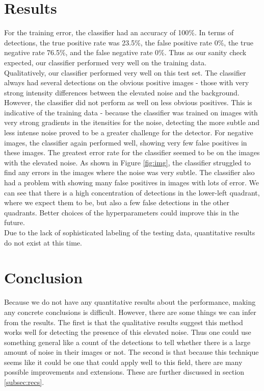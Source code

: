 \documentclass[twocolumn,longauthor]{aastex61}
\begin{document}
\newpage
\section{Results} \label{sec:results}
\noindent For the training error, the classifier had an accuracy of 100\%. In terms of detections, the true positive rate was 23.5\%, the false positive rate 0\%, the true negative rate 76.5\%, and the false negative rate 0\%. Thus as our sanity check expected, our classifier performed very well on the training data.\\
\indent Qualitatively, our classifier performed very well on this test set. The classifier always had several detections on the obvious positive images - those with very strong intensity differences between the elevated noise and the background. However, the classifier did not perform as well on less obvious positives. This is indicative of the training data - because the classifier was trained on images with very strong gradients in the itensities for the noise, detecting the more subtle and less intense noise proved to be a greater challenge for the detector. For negative images, the classifier again performed well, showing very few false positives in these images. The greatest error rate for the classifier seemed to be on the images with the elevated noise. As shown in Figure \ref{fig:img}, the classifier struggled to find any errors in the images where the noise was very subtle. The classifier also had a problem with showing many false positives in images with lots of error. We can see that there is a high concentration of detections in the lower-left quadrant, where we expect them to be, but also a few false detections in the other quadrants. Better choices of the hyperparameters could improve this in the future.\\
\indent Due to the lack of sophisticated labeling of the testing data, quantitative results do not exist at this time.



\section{Conclusion} \label{sec:conclusion}
\noindent Because we do not have any quantitative results about the performance, making any concrete conclusions is difficult. However, there are some things we can infer from the results. The first is that the qualitative results suggest this method works well for detecting the presence of this elevated noise. Thus one could use something general like a count of the detections to tell whether there is a large amount of noise in their images or not. The second is that because this technique seems like it could be one that could apply well to this field, there are many possible improvements and extensions. These are further discussed in section \ref{subsec:recs}.
\end{document}
